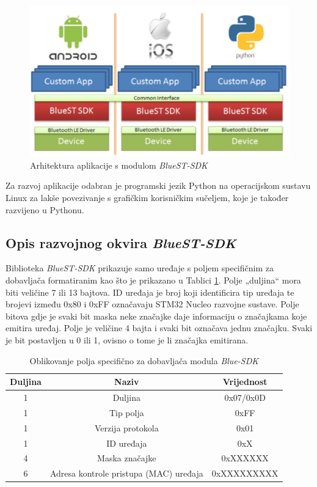 \begin{figure}[ht]
	\includegraphics[width=\linewidth]{imgs/bluest_stack}
	\caption{Arhitektura aplikacije s modulom \textit{BlueST-SDK} \cite{bluest}}
	\label{fig:bluest_stack}
\end{figure}


Za razvoj aplikacije odabran je programski jezik Python na operacijskom sustavu Linux za lakše povezivanje s grafičkim korisničkim sučeljem, koje je također razvijeno u Pythonu. 

\subsection{Opis razvojnog okvira \textit{BlueST-SDK}}

Biblioteka \textit{BlueST-SDK} prikazuje samo uređaje s poljem specifičnim za dobavljača formatiranim kao što je prikazano u Tablici \ref{table:formatting}. Polje „duljina“ mora biti veličine 7 ili 13 bajtova. ID uređaja je broj koji identificira tip uređaja te brojevi između 0x80 i 0xFF označavaju STM32 Nucleo razvojne sustave. Polje bitova gdje je svaki bit maska neke značajke daje informaciju o značajkama koje emitira uređaj. Polje je veličine 4 bajta i svaki bit označava jednu značajku. Svaki je bit postavljen u 0 ili 1, ovisno o tome je li značajka emitirana. 

\begin{table}[ht!]
	\centering
	\caption{Oblikovanje polja specifično za dobavljača modula \textit{Blue-SDK} \cite{bluest}}
	\begin{tabular}{|c| c| c|}
		\hline
		\rowcolor{lightblue}  
		\textbf{Duljina} & \textbf{Naziv} & \textbf{Vrijednost} \\ \hline
		1 & Duljina & 0x07/0x0D \\ \hline
		1 & Tip polja & 0xFF \\ \hline
		1 & Verzija protokola & 0x01 \\ \hline
		1 & ID uređaja & 0xX \\ \hline
		4 & Maska značajke & 0xXXXXXX \\ \hline
		6 & Adresa kontrole pristupa (MAC) uređaja & 0xXXXXXXXXX \\ \hline
	\end{tabular}
	\label{table:formatting}
\end{table}

